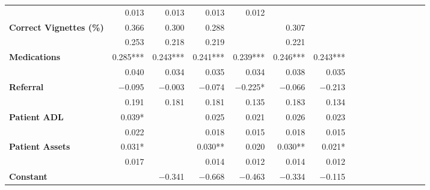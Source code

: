 \begin{tabular}{@{\extracolsep{5pt}}lrrrrrrrrrrrrrrr}
{\bf } & 0.013\phantom{\phantom{)}***} & 0.013\phantom{\phantom{)}***} & 0.013\phantom{\phantom{)}***} & 0.012\phantom{\phantom{)}***} & \phantom{***} & \phantom{***} \\
{\bf Correct Vignettes (\%)} & 0.366\phantom{\phantom{)}***} & 0.300\phantom{\phantom{)}***} & 0.288\phantom{\phantom{)}***} & \phantom{***} & 0.307\phantom{\phantom{)}***} & \phantom{***} \\
{\bf } & 0.253\phantom{\phantom{)}***} & 0.218\phantom{\phantom{)}***} & 0.219\phantom{\phantom{)}***} & \phantom{***} & 0.221\phantom{\phantom{)}***} & \phantom{***} \\
{\bf Medications} & 0.285\phantom{)}*** & 0.243\phantom{)}*** & 0.241\phantom{)}*** & 0.239\phantom{)}*** & 0.246\phantom{)}*** & 0.243\phantom{)}*** \\
{\bf } & 0.040\phantom{\phantom{)}***} & 0.034\phantom{\phantom{)}***} & 0.035\phantom{\phantom{)}***} & 0.034\phantom{\phantom{)}***} & 0.038\phantom{\phantom{)}***} & 0.035\phantom{\phantom{)}***} \\
{\bf Referral} & $-$0.095\phantom{\phantom{)}***} & $-$0.003\phantom{\phantom{)}***} & $-$0.074\phantom{\phantom{)}***} & $-$0.225\phantom{)}*\phantom{**} & $-$0.066\phantom{\phantom{)}***} & $-$0.213\phantom{\phantom{)}***} \\
{\bf } & 0.191\phantom{\phantom{)}***} & 0.181\phantom{\phantom{)}***} & 0.181\phantom{\phantom{)}***} & 0.135\phantom{\phantom{)}***} & 0.183\phantom{\phantom{)}***} & 0.134\phantom{\phantom{)}***} \\
{\bf Patient ADL} & 0.039\phantom{)}*\phantom{**} & \phantom{***} & 0.025\phantom{\phantom{)}***} & 0.021\phantom{\phantom{)}***} & 0.026\phantom{\phantom{)}***} & 0.023\phantom{\phantom{)}***} \\
{\bf } & 0.022\phantom{\phantom{)}***} & \phantom{***} & 0.018\phantom{\phantom{)}***} & 0.015\phantom{\phantom{)}***} & 0.018\phantom{\phantom{)}***} & 0.015\phantom{\phantom{)}***} \\
{\bf Patient Assets} & 0.031\phantom{)}*\phantom{**} & \phantom{***} & 0.030\phantom{)}**\phantom{*} & 0.020\phantom{\phantom{)}***} & 0.030\phantom{)}**\phantom{*} & 0.021\phantom{)}*\phantom{**} \\
{\bf } & 0.017\phantom{\phantom{)}***} & \phantom{***} & 0.014\phantom{\phantom{)}***} & 0.012\phantom{\phantom{)}***} & 0.014\phantom{\phantom{)}***} & 0.012\phantom{\phantom{)}***} \\
{\bf Constant} & \phantom{***} & $-$0.341\phantom{\phantom{)}***} & $-$0.668\phantom{\phantom{)}***} & $-$0.463\phantom{\phantom{)}***} & $-$0.334\phantom{\phantom{)}***} & $-$0.115\phantom{\phantom{)}***} \\

\end{tabular}

